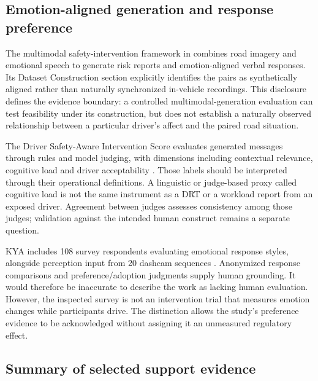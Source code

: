 \documentclass[11pt,a4paper]{article}
\begin{document}
\subsection{Emotion-aligned generation and response
preference}\label{emotion-aligned-generation-and-response-preference}

The multimodal safety-intervention framework in \citep{S7} combines road
imagery and emotional speech to generate risk reports and
emotion-aligned verbal responses. Its Dataset Construction section
explicitly identifies the pairs as synthetically aligned rather than
naturally synchronized in-vehicle recordings. This disclosure defines
the evidence boundary: a controlled multimodal-generation evaluation can
test feasibility under its construction, but does not establish a
naturally observed relationship between a particular driver's affect and
the paired road situation.

The Driver Safety-Aware Intervention Score evaluates generated messages
through rules and model judging, with dimensions including contextual
relevance, cognitive load and driver acceptability \citep{S8}. Those
labels should be interpreted through their operational definitions. A
linguistic or judge-based proxy called cognitive load is not the same
instrument as a DRT or a workload report from an exposed driver.
Agreement between judges assesses consistency among those judges;
validation against the intended human construct remains a separate
question.

KYA includes 108 survey respondents evaluating emotional response
styles, alongside perception input from 20 dashcam sequences
\citep{S11}. Anonymized response comparisons and preference/adoption
judgments supply human grounding. It would therefore be inaccurate to
describe the work as lacking human evaluation. However, the inspected
survey is not an intervention trial that measures emotion changes while
participants drive. The distinction allows the study's preference
evidence to be acknowledged without assigning it an unmeasured
regulatory effect.

\subsection{Summary of selected support
evidence}\label{summary-of-selected-support-evidence}
\end{document}
